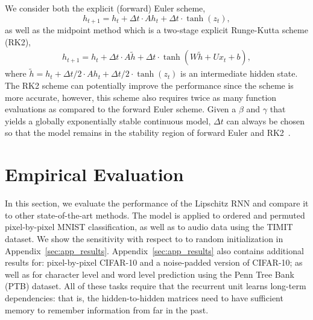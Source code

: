 \documentclass{article} \usepackage{iclr2021_conference,times}
\begin{document}
We consider both the explicit (forward) Euler scheme, 
\begin{equation} \label{eq:Lipschitz_unit}
	h_{t+1} = h_{t} + \Delta t \cdot Ah_{t} + \Delta t \cdot \tanh(z_t),
\end{equation}
as well as the midpoint method which is a two-stage explicit Runge-Kutta scheme (RK2),
\begin{align} \label{eq:rk2}
	h_{t+1} = h_{t} + \Delta t \cdot A\tilde{h} + \Delta t \cdot \tanh(W \tilde{h} + Ux_{t} + b), 
\end{align}
where $\tilde{h} = h_{t} + \Delta t/2 \cdot Ah_{t} + \Delta t/2 \cdot \tanh(z_t)$ is an intermediate hidden state.
The RK2 scheme can potentially improve the performance since the scheme is more accurate, however, this scheme also requires twice as many function evaluations as compared to the forward Euler scheme. 
Given a $\beta$ and $\gamma$ that yields a globally exponentially stable continuous model, $\Delta t$ can always be chosen so that the model remains in the stability region of forward Euler and RK2~\citep{LeVeque}.

\section{Empirical Evaluation}\label{sec:experiments}

In  this  section,  we  evaluate the  performance  of the Lipschitz RNN and compare it to other state-of-the-art methods.
The model is applied to ordered and permuted pixel-by-pixel MNIST classification, as well as to audio data using the TIMIT dataset.
We show the sensitivity with respect to to random initialization in Appendix~\ref{sec:app_results}. 
Appendix~\ref{sec:app_results} also contains additional results for: pixel-by-pixel CIFAR-10 and a noise-padded version of CIFAR-10; as well as for character level and word level prediction using the Penn Tree Bank (PTB) dataset.
All of these tasks require that the recurrent unit learns long-term dependencies: that is, the hidden-to-hidden matrices need to have sufficient memory to remember information from far in the past.
\end{document}

